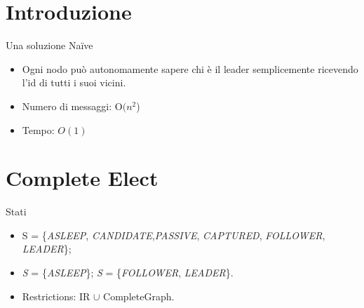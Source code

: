 

\section{Introduzione}
\begin{frame}{Una soluzione Na{\"i}ve}


\begin{itemize}
\setlength\itemsep{2em}

 \item Ogni nodo può autonomamente sapere chi è il leader semplicemente ricevendo l'id di tutti i suoi vicini.
 \item Numero di messaggi: O$(n^2$)
 \item Tempo: $O(1)$
\end{itemize}


\end{frame}

\section{Complete Elect}
\begin{frame}{Stati}


\begin{itemize}
\setlength\itemsep{2em}

 \item S = \{\textit{ASLEEP}, \textit{CANDIDATE},\textit{PASSIVE}, \textit{CAPTURED}, \textit{FOLLOWER}, \textit{LEADER}\};
 \item \textit{S} = \{\textit{ASLEEP}\}; \textit{S} = \{\textit{FOLLOWER}, \textit{LEADER}\}.
 \item Restrictions: IR $\cup$ CompleteGraph.
\end{itemize}
\end{frame}


